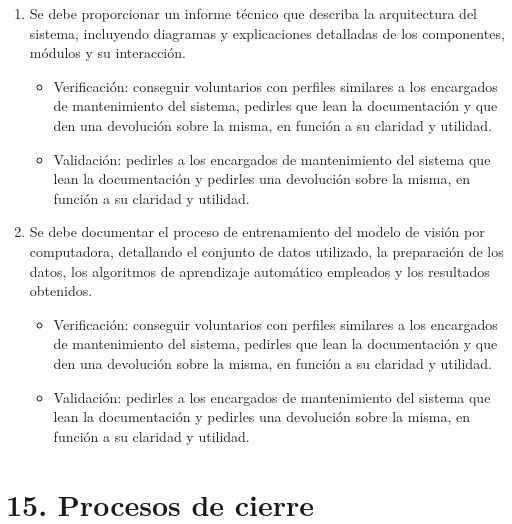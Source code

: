 \documentclass[
11pt, %
]{charter}
\begin{document}
\begin{enumerate}
\begin{itemize}
\end{itemize}	
			\item Se debe proporcionar un informe técnico que describa la arquitectura del sistema, incluyendo diagramas y explicaciones detalladas de los componentes, módulos y su interacción.
			\begin{itemize}
	\item Verificación: conseguir voluntarios con perfiles similares a los encargados de mantenimiento del sistema, pedirles que lean la documentación y que den una devolución sobre la misma, en función a su claridad y utilidad.
	\item Validación: pedirles a los encargados de mantenimiento del sistema que lean la documentación y pedirles una devolución sobre la misma, en función a su claridad y utilidad.
\end{itemize}
			\item Se debe documentar el proceso de entrenamiento del modelo de visión por computadora, detallando el conjunto de datos utilizado, la preparación de los datos, los algoritmos de aprendizaje automático empleados y los resultados obtenidos.
			\begin{itemize}
	\item Verificación: conseguir voluntarios con perfiles similares a los encargados de mantenimiento del sistema, pedirles que lean la documentación y que den una devolución sobre la misma, en función a su claridad y utilidad.
	\item Validación: pedirles a los encargados de mantenimiento del sistema que lean la documentación y pedirles una devolución sobre la misma, en función a su claridad y utilidad.
\end{itemize}
\end{enumerate}

\section{15. Procesos de cierre}    
\label{sec:cierre}
\end{document}
